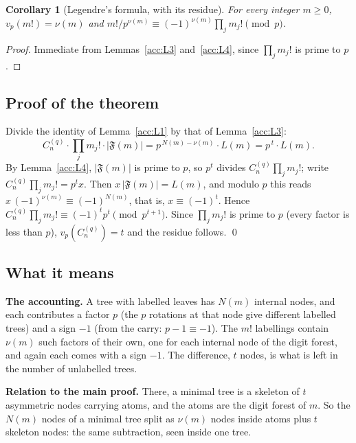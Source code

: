 \documentclass[11pt]{article}
\newtheorem{corollary}[theorem]{Corollary}
\theoremstyle{definition}
\theoremstyle{remark}
\numberwithin{equation}{section}
\numberwithin{figure}{section}
\newcommand{\C}{C_n^{(q)}}
\newcommand{\F}{\mathfrak F}
\begin{document}
\begin{corollary}[Legendre's formula, with its residue]
For every integer $m\ge0$, $v_p(m!)=\nu(m)$ and
$m!/p^{\nu(m)}\equiv(-1)^{\nu(m)}\prod_jm_j!\pmod p$.
\end{corollary}
\begin{proof}
Immediate from Lemmas~\ref{acc:L3} and~\ref{acc:L4}, since $\prod_jm_j!$ is prime to $p$.
\end{proof}

\subsection{Proof of the theorem}

Divide the identity of Lemma~\ref{acc:L1} by that of Lemma~\ref{acc:L3}:
\[
 \C\cdot\prod_jm_j!\cdot|\F(m)|=p^{\,N(m)-\nu(m)}\cdot L(m)=p^{\,t}\cdot L(m).
\]
By Lemma~\ref{acc:L4}, $|\F(m)|$ is prime to $p$, so $p^t$ divides $\C\prod_jm_j!$; write
$\C\prod_jm_j!=p^tx$. Then $x\,|\F(m)|=L(m)$, and modulo $p$ this reads
$x\,(-1)^{\nu(m)}\equiv(-1)^{N(m)}$, that is, $x\equiv(-1)^t$. Hence
$\C\prod_jm_j!\equiv(-1)^tp^t\pmod{p^{t+1}}$. Since $\prod_jm_j!$ is prime to $p$ (every factor
is less than $p$), $v_p(\C)=t$ and the residue follows. \qed

\subsection{What it means}

\textbf{The accounting.} A tree with labelled leaves has $N(m)$ internal nodes, and each
contributes a factor $p$ (the $p$ rotations at that node give different labelled trees) and a
sign $-1$ (from the carry: $p-1\equiv-1$). The $m!$ labellings contain $\nu(m)$ such factors
of their own, one for each internal node of the digit forest, and again each comes with a
sign $-1$. The difference, $t$ nodes, is what is left in the number of unlabelled trees.

\textbf{Relation to the main proof.} There, a minimal tree is a skeleton of $t$ asymmetric
nodes carrying atoms, and the atoms are the digit forest of $m$. So the $N(m)$ nodes of a
minimal tree split as $\nu(m)$ nodes inside atoms plus $t$ skeleton nodes: the same
subtraction, seen inside one tree.
\end{document}
